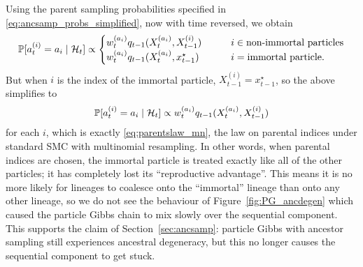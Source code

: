 Using the parent sampling probabilities specified in \eqref{eq:ancsamp_probs_simplified},
now with time reversed,
we obtain
\begin{equation*}
\mathbb{P}[a_t^{(i)} = a_i \mid \mathcal{H}_t ] \propto
\begin{cases}
w_t^{(a_i)} q_{t-1}(X_t^{(a_i)}, X_{t-1}^{(i)}) &\qquad i\in\text{non-immortal particles}\\
w_t^{(a_i)} q_{t-1}(X_t^{(a_i)}, x_{t-1}^\star) &\qquad i=\text{immortal particle} .
\end{cases} 
\end{equation*}
But when $i$ is the index of the immortal particle, $X_{t-1}^{(i)} = x_{t-1}^\star$, so the above simplifies to
\begin{equation*}
\mathbb{P}[a_t^{(i)} = a_i \mid \mathcal{H}_t ] \propto
w_t^{(a_i)} q_{t-1}(X_t^{(a_i)}, X_{t-1}^{(i)})
\end{equation*}
for each $i$, which is exactly \eqref{eq:parentslaw_mn}, the law on parental indices under standard SMC with multinomial resampling.
In other words, when parental indices are chosen, the immortal particle is treated exactly like all of the other particles; it has completely lost its ``reproductive advantage''.
This means it is no more likely for lineages to coalesce onto the ``immortal'' lineage than onto any other lineage, so we do not see the behaviour of Figure~\ref{fig:PG_ancdegen} which caused the particle Gibbs chain to mix slowly over the sequential component.
This supports the claim of Section~\ref{sec:ancsamp}: particle Gibbs with ancestor sampling still experiences ancestral degeneracy, but this no longer causes the sequential component to get stuck.


